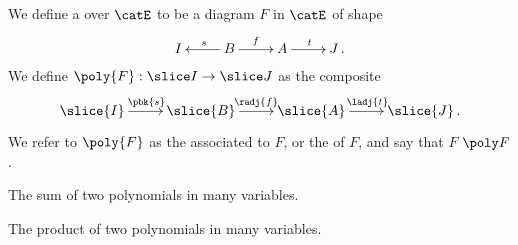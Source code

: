 \begin{definition}
  We define a  over $\catE$ to be a diagram $F$ in $\catE$ of shape
  \begin{equation}
  \lean{MvPoly}
  \label{equ:poly}
  \xymatrix{
  I  & B \ar[l]_s \ar[r]^f & A \ar[r]^t & J \, . }
  \end{equation}
  We define $\poly{F}:\slice I \to \slice J$ as the composite
  \[
  \xymatrix{
  \slice{I} \ar[r]^{\pbk{s}} & \slice{B} \ar[r]^{\radj{f}} & \slice{A} \ar[r]^{\ladj{t}} & \slice{J} \, . }
  \]
  We refer to $\poly{F}$ as the  associated to $F$, or
  the  of $F$, and say that $F$  $\poly F$.
\end{definition}

\begin{definition}
The sum of two polynomials in many variables.
\end{definition}

\begin{definition}
The product of two polynomials in many variables.
\end{definition}

